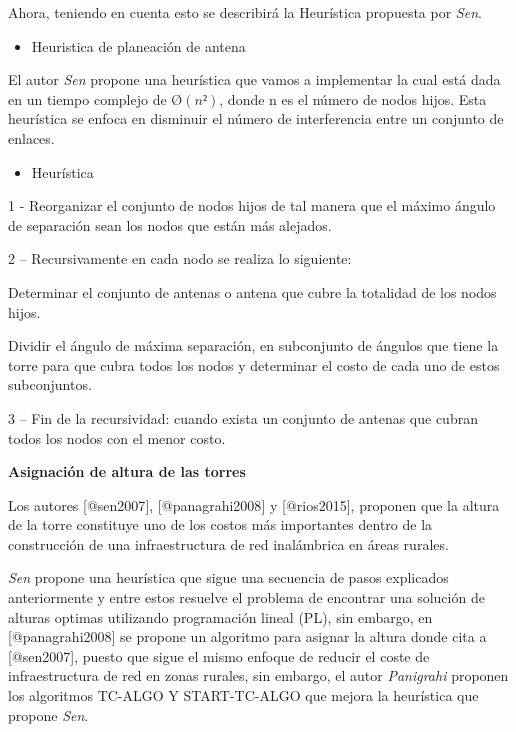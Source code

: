 \documentclass[]{article}
\providecommand{\tightlist}{%
  \setlength{\itemsep}{0pt}\setlength{\parskip}{0pt}}
\begin{document}
Ahora, teniendo en cuenta esto se describirá la Heurística propuesta por
\emph{Sen}.

\begin{itemize}
\tightlist
\item
  Heuristica de planeación de antena
\end{itemize}

El autor \emph{Sen} propone una heurística que vamos a implementar la
cual está dada en un tiempo complejo de \(Ø(n²)\), donde n es el número
de nodos hijos. Esta heurística se enfoca en disminuir el número de
interferencia entre un conjunto de enlaces.

\begin{itemize}
\tightlist
\item
  Heurística
\end{itemize}

1 - Reorganizar el conjunto de nodos hijos de tal manera que el máximo
ángulo de separación sean los nodos que están más alejados.

2 -- Recursivamente en cada nodo se realiza lo siguiente:

Determinar el conjunto de antenas o antena que cubre la totalidad de los
nodos hijos.

Dividir el ángulo de máxima separación, en subconjunto de ángulos que
tiene la torre para que cubra todos los nodos y determinar el costo de
cada uno de estos subconjuntos.

3 -- Fin de la recursividad: cuando exista un conjunto de antenas que
cubran todos los nodos con el menor costo.

\textbf{Asignación de altura de las torres}

Los autores {[}@sen2007{]}, {[}@panagrahi2008{]} y {[}@rios2015{]},
proponen que la altura de la torre constituye uno de los costos más
importantes dentro de la construcción de una infraestructura de red
inalámbrica en áreas rurales.

\emph{Sen} propone una heurística que sigue una secuencia de pasos
explicados anteriormente y entre estos resuelve el problema de encontrar
una solución de alturas optimas utilizando programación lineal (PL), sin
embargo, en {[}@panagrahi2008{]} se propone un algoritmo para asignar la
altura donde cita a {[}@sen2007{]}, puesto que sigue el mismo enfoque de
reducir el coste de infraestructura de red en zonas rurales, sin
embargo, el autor \emph{Panigrahi} proponen los algoritmos TC-ALGO Y
START-TC-ALGO que mejora la heurística que propone \emph{Sen}.
\end{document}
